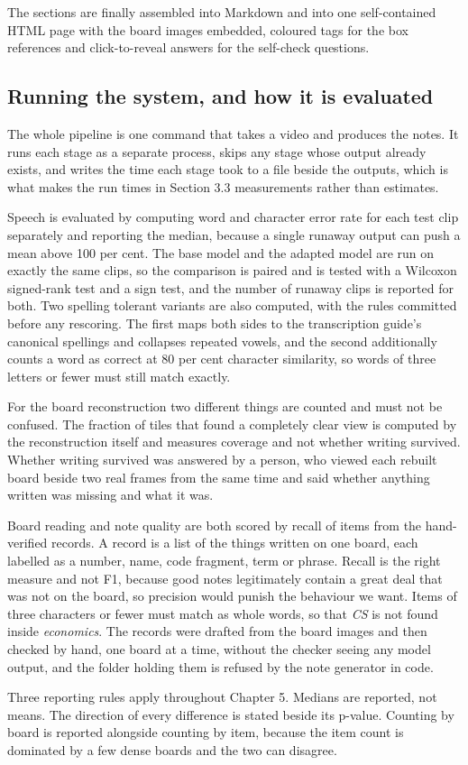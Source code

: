 The sections are finally assembled into Markdown and into one self-contained HTML page
with the board images embedded, coloured tags for the box references and click-to-reveal
answers for the self-check questions.

\subsection{Running the system, and how it is evaluated}

The whole pipeline is one command that takes a video and produces the notes. It runs each
stage as a separate process, skips any stage whose output already exists, and writes the
time each stage took to a file beside the outputs, which is what makes the run times in
Section 3.3 measurements rather than estimates.

Speech is evaluated by computing word and character error rate for each test clip
separately and reporting the median, because a single runaway output can push a mean above
100 per cent. The base model and the adapted model are run on exactly the same clips, so
the comparison is paired and is tested with a Wilcoxon signed-rank test and a sign test,
and the number of runaway clips is reported for both. Two spelling tolerant variants are
also computed, with the rules committed before any rescoring. The first maps both sides to
the transcription guide's canonical spellings and collapses repeated vowels, and the
second additionally counts a word as correct at 80 per cent character similarity, so words
of three letters or fewer must still match exactly.

For the board reconstruction two different things are counted and must not be confused.
The fraction of tiles that found a completely clear view is computed by the reconstruction
itself and measures coverage and not whether writing survived. Whether writing
survived was answered by a person, who viewed each rebuilt board beside two real frames
from the same time and said whether anything written was missing and what it was.

Board reading and note quality are both scored by recall of items from the hand-verified
records. A record is a list of the things written on one board, each labelled as a number,
name, code fragment, term or phrase. Recall is the right measure and not F1, because
good notes legitimately contain a great deal that was not on the board, so precision would
punish the behaviour we want. Items of three characters or fewer must match as whole
words, so that \textit{CS} is not found inside \textit{economics}. The records were
drafted from the board images and then checked by hand, one board at a time, without the
checker seeing any model output, and the folder holding them is refused by the note
generator in code.

Three reporting rules apply throughout Chapter 5. Medians are reported, not means.
The direction of every difference is stated beside its p-value. Counting by board is
reported alongside counting by item, because the item count is dominated by a few dense
boards and the two can disagree.
